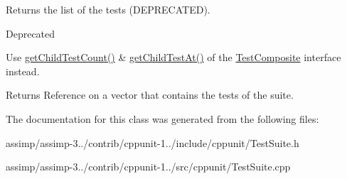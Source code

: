 Returns the list of the tests (D\+E\+P\+R\+E\+C\+A\+T\+E\+D). \begin{DoxyRefDesc}{Deprecated}
\item[\hyperlink{deprecated__deprecated000021}{Deprecated}]Use \hyperlink{class_test_suite_aeaabfd3afef12412cd390b90128a7d87}{get\+Child\+Test\+Count()} \& \hyperlink{class_test_a5311b8b24ec3d92f749272f5c642d42f}{get\+Child\+Test\+At()} of the \hyperlink{class_test_composite}{Test\+Composite} interface instead. \begin{DoxyReturn}{Returns}
Reference on a vector that contains the tests of the suite. 
\end{DoxyReturn}
\end{DoxyRefDesc}


The documentation for this class was generated from the following files\+:\begin{DoxyCompactItemize}
\item 
assimp/assimp-\/3../contrib/cppunit-\/1../include/cppunit/Test\+Suite.\+h\item 
assimp/assimp-\/3../contrib/cppunit-\/1../src/cppunit/Test\+Suite.\+cpp\end{DoxyCompactItemize}
